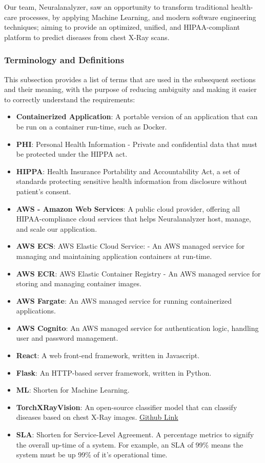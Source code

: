 \documentclass[12pt]{article}
\begin{document}
Our team, Neuralanalyzer, saw an opportunity to transform traditional health-care processes, by applying Machine Learning, and modern software engineering techniques; aiming to provide an optimized, unified, and HIPAA-compliant platform to predict diseases from chest X-Ray scans.
\subsubsection{Terminology and  Definitions}

This subsection provides a list of terms that are used in the subsequent
sections and their meaning, with the purpose of reducing ambiguity and making it
easier to correctly understand the requirements:

\begin{itemize}

\item \textbf{Containerized Application}: A portable version of an application that can be run on a container run-time, such as Docker.
\item \textbf{PHI}: Personal Health Information - Private and confidential data that must be protected under the HIPPA act.
\item \textbf{HIPPA}: Health Insurance Portability and Accountability Act, a set of standards protecting sensitive health information from disclosure without patient's consent.
\item \textbf{AWS - Amazon Web Services}: A public cloud provider, offering all HIPAA-compliance cloud services that helps Neuralanalyzer host, manage, and scale our application.
\item \textbf{AWS ECS}: AWS Elastic Cloud Service: - An AWS managed service for managing and maintaining application containers at run-time.
\item \textbf{AWS ECR}: AWS Elastic Container Registry - An AWS managed service for storing and managing container images.
\item \textbf{AWS Fargate}: An AWS managed service for running containerized applications.
\item \textbf{AWS Cognito}: An AWS managed service for authentication logic, handling user and password management.
\item \textbf{React}: A web front-end framework, written in Javascript.
\item \textbf{Flask}: An HTTP-based server framework, written in Python.
\item \textbf{ML}: Shorten for Machine Learning.
\item \textbf{TorchXRayVision}: An open-source classifier model that can classify diseases based on chest X-Ray images. \href{https://github.com/mlmed/torchxrayvision}{Github Link}
\item \textbf{SLA}: Shorten for Service-Level Agreement. A percentage metrics to signify the overall up-time of a system. For example, an SLA of 99\% means the system must be up 99\% of it's operational time.

\end{itemize}
\end{document}
